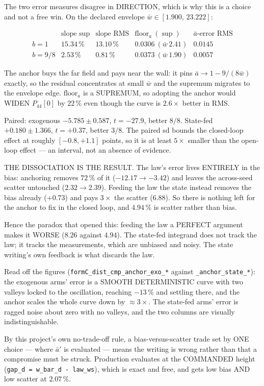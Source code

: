 \documentclass[11pt,a4paper,fontset=none]{ctexart}
\newcommand{\ba}{\bar{a}}
\newcommand{\bw}{\bar{w}}
\begin{document}
The two error measures disagree in DIRECTION, which is why this is a choice and
not a free win. On the declared envelope $\bw \in [1.900,\,23.222]$:

\begin{equation*}
\begin{array}{lcccc}
 & \text{slope sup} & \text{slope RMS} & \mathrm{floor}_a\ (\sup) & \ba\text{-error RMS} \\[0.2em]
b = 1   & 15.34\,\% & 13.10\,\% & 0.0306\ (\bw\,2.41) & 0.0145 \\
b = 9/8 & 2.53\,\%  & 0.81\,\%  & 0.0373\ (\bw\,1.90) & 0.0057
\end{array}
\end{equation*}

The anchor buys the far field and pays near the wall: it pins
$\ba \to 1 - 9/(8\bw)$ exactly, so the residual concentrates at small $\bw$ and
the supremum migrates to the envelope edge. $\mathrm{floor}_a$ is a SUPREMUM, so
adopting the anchor would WIDEN $P_{44}[0]$ by $22\,\%$ even though the curve is
$2.6\times$ better in RMS.

Paired: exogenous $-5.785 \pm 0.587$, $t = -27.9$, better $8/8$. State-fed
$+0.180 \pm 1.366$, $t = +0.37$, better $3/8$. The paired sd bounds the
closed-loop effect at roughly $[-0.8, +1.1]$ points, so it is at least $5\times$
smaller than the open-loop effect --- an interval, not an absence of evidence.

THE DISSOCIATION IS THE RESULT. The law's error lives ENTIRELY in the bias:
anchoring removes $72\,\%$ of it ($-12.17 \to -3.42$) and leaves the across-seed
scatter untouched ($2.32 \to 2.39$). Feeding the law the state instead removes
the bias already ($+0.73$) and pays $3\times$ the scatter ($6.88$). So there is
nothing left for the anchor to fix in the closed loop, and $4.94\,\%$ is scatter
rather than bias.

Hence the paradox that opened this: feeding the law a PERFECT argument makes it
WORSE ($8.26$ against $4.94$). The state-fed integrand does not track the law;
it tracks the measurements, which are unbiased and noisy. The state writing's
own feedback is what discards the law.

Read off the figures (\texttt{formC\_dist\_cmp\_anchor\_exo\_*} against
\texttt{\_anchor\_state\_*}): the exogenous arms' error is a SMOOTH DETERMINISTIC
curve with two valleys locked to the oscillation, reaching $-13\,\%$ and settling
there, and the anchor scales the whole curve down by $\approx 3\times$. The
state-fed arms' error is ragged noise about zero with no valleys, and the two
columns are visually indistinguishable.

By this project's own no-trade-off rule, a bias-versus-scatter trade set by ONE
choice --- where $\ba'$ is evaluated --- means the writing is wrong rather than
that a compromise must be struck. Production evaluates at the COMMANDED height
(\texttt{gap\_d = w\_bar\_d - law\_ws}), which is exact and free, and gets low
bias AND low scatter at $2.07\,\%$.
\end{document}
